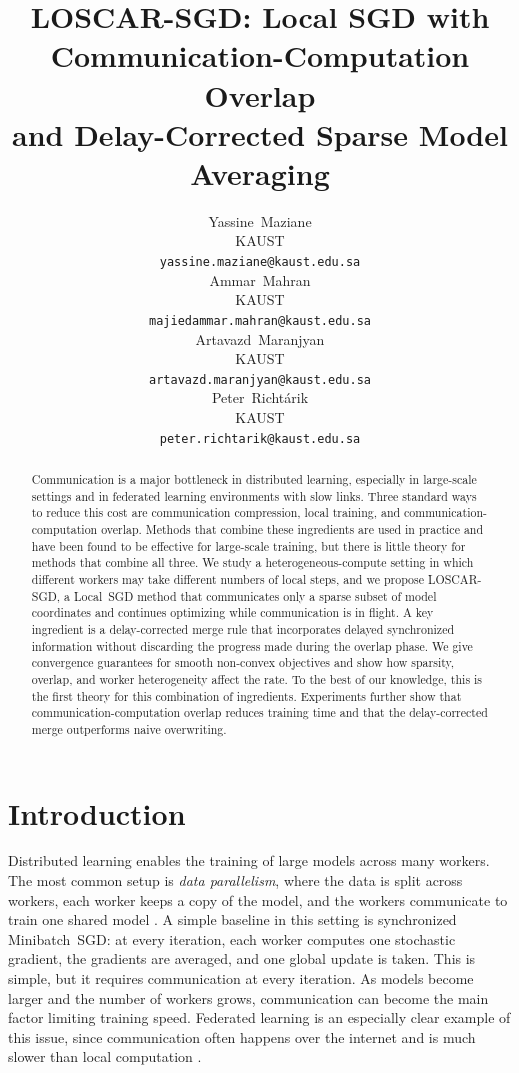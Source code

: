 \documentclass{article}
\title{
    {\color{oscar} LOSCAR}-SGD: Local SGD 
    with Communication-Computation Overlap\\
    and Delay-Corrected Sparse Model Averaging
}
\author{%
  Yassine~Maziane \\
  KAUST \\
  \texttt{yassine.maziane@kaust.edu.sa} \\
  \And
  Ammar~Mahran \\
  KAUST \\
  \texttt{majiedammar.mahran@kaust.edu.sa} \\
  \And
  Artavazd~Maranjyan \\
  KAUST \\
  \texttt{artavazd.maranjyan@kaust.edu.sa} \\
  \And
  Peter~Richt\'{a}rik \\
  KAUST \\
  \texttt{peter.richtarik@kaust.edu.sa}
}
\theoremstyle{plain}
\theoremstyle{definition}
\newcommand{\algname}[1]{{\color{alggray}\small\sf#1}\xspace}
\newcommand{\loscar}{\algname{\color{oscar} LOSCAR}}
\newcommand{\loscarsgd}{\loscar-\sgd}
\newcommand{\minibatch}{\algname{Minibatch~SGD}}
\newcommand{\sgd}{\algname{SGD}}
\newcommand{\localsgd}{\algname{Local~SGD}}
\begin{document}
\maketitle

\begin{abstract}
    Communication is a major bottleneck in distributed learning, especially in large-scale settings and in federated learning environments with slow links. Three standard ways to reduce this cost are communication compression, local training, and communication-computation overlap. Methods that combine these ingredients are used in practice and have been found to be effective for large-scale training, but there is little theory for methods that combine all three. We study a heterogeneous-compute setting in which different workers may take different numbers of local steps, and we propose \loscarsgd, a \localsgd method that communicates only a sparse subset of model coordinates and continues optimizing while communication is in flight. A key ingredient is a delay-corrected merge rule that incorporates delayed synchronized information without discarding the progress made during the overlap phase. We give convergence guarantees for smooth non-convex objectives and show how sparsity, overlap, and worker heterogeneity affect the rate. To the best of our knowledge, this is the first theory for this combination of ingredients. Experiments further show that communication-computation overlap reduces training time and that the delay-corrected merge outperforms naive overwriting.
\end{abstract}
% 
% 
\section{Introduction}\label{sec:introduction}
% 
Distributed learning enables the training of large models across many workers.
The most common setup is \textit{data parallelism}, where the data is split across workers, each worker keeps a copy of the model, and the workers communicate to train one shared model \citep{goyal2017accurate, li2020pytorch, zhao2023pytorch}.
A simple baseline in this setting is synchronized \minibatch: at every iteration, each worker computes one stochastic gradient, the gradients are averaged, and one global update is taken.
This is simple, but it requires communication at every iteration.
As models become larger and the number of workers grows, communication can become the main factor limiting training speed.
Federated learning is an especially clear example of this issue, since communication often happens over the internet and is much slower than local computation \citep{mcmahan2017communication, kairouz2021advances, wang2021field}.
\end{document}
